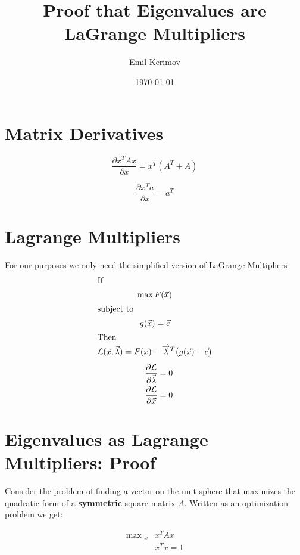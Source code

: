 \documentclass[a4paper]{article}
\title{Proof that Eigenvalues are LaGrange Multipliers}
\author{Emil Kerimov}
\date{\today}
\begin{document}
\maketitle

\section{Matrix Derivatives}\label{elm:sec:matrix-derivatives}

\begin{equation}
\frac{\partial x^T A x}{\partial x} = x^T(A^T + A)
\end{equation}

\begin{equation}
\frac{\partial x^T a}{\partial x} = a^T
\end{equation}

\section{Lagrange Multipliers}\label{elm:sec:lagrange-multipliers}
For our purposes we only need the simplified version of LaGrange Multipliers
\begin{gather*}
\shortintertext{If}
\max F(\vec{x})\\
\shortintertext{subject to}
g(\vec{x}) = \vec{c}\\
\shortintertext{Then}
\mathcal{L}(\vec{x}, \vec{\lambda}) = F(\vec{x}) - \overrightarrow{\lambda}^T \bigl(g(\vec{x}) - \vec{c}\bigr) \\[1ex]
\begin{alignedat}{2}
\quad&& \frac{\partial \mathcal{L}}{\partial \vec{\lambda}} &= 0\\
\quad&& \frac{\partial \mathcal{L}}{\partial \vec{x}} &= 0\\
\end{alignedat}
\end{gather*}

\section{Eigenvalues as Lagrange Multipliers: Proof}\label{elm:sec:proof}

Consider the problem of finding a vector on the unit sphere that maximizes the quadratic form of a \textbf{symmetric} square matrix $A$. Written as an optimization problem we get:

\begin{align}
\text{max }_{x} & x^{T} A x \\
& x^{T} x = 1  \nonumber
\end{align}
\end{document}
